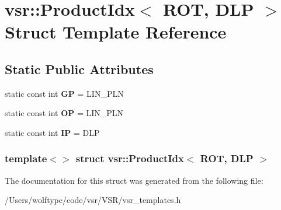 \hypertarget{structvsr_1_1_product_idx_3_01_r_o_t_00_01_d_l_p_01_4}{\section{vsr\-:\-:Product\-Idx$<$ R\-O\-T, D\-L\-P $>$ Struct Template Reference}
\label{structvsr_1_1_product_idx_3_01_r_o_t_00_01_d_l_p_01_4}
}
\subsection*{Static Public Attributes}
\begin{DoxyCompactItemize}
\item 
\hypertarget{structvsr_1_1_product_idx_3_01_r_o_t_00_01_d_l_p_01_4_ae50d3dd9d5b4aa38586cad94fe5c2aaf}{static const int {\bfseries G\-P} = L\-I\-N\-\_\-\-P\-L\-N}\label{structvsr_1_1_product_idx_3_01_r_o_t_00_01_d_l_p_01_4_ae50d3dd9d5b4aa38586cad94fe5c2aaf}

\item 
\hypertarget{structvsr_1_1_product_idx_3_01_r_o_t_00_01_d_l_p_01_4_a73e0216fdcddb2f378d4607c011fc5ba}{static const int {\bfseries O\-P} = L\-I\-N\-\_\-\-P\-L\-N}\label{structvsr_1_1_product_idx_3_01_r_o_t_00_01_d_l_p_01_4_a73e0216fdcddb2f378d4607c011fc5ba}

\item 
\hypertarget{structvsr_1_1_product_idx_3_01_r_o_t_00_01_d_l_p_01_4_a282ee201e4a1ec7c2e3b2a467d6a5302}{static const int {\bfseries I\-P} = D\-L\-P}\label{structvsr_1_1_product_idx_3_01_r_o_t_00_01_d_l_p_01_4_a282ee201e4a1ec7c2e3b2a467d6a5302}

\end{DoxyCompactItemize}
\subsubsection*{template$<$$>$ struct vsr\-::\-Product\-Idx$<$ R\-O\-T, D\-L\-P $>$}



The documentation for this struct was generated from the following file\-:\begin{DoxyCompactItemize}
\item 
/\-Users/wolftype/code/vsr/\-V\-S\-R/vsr\-\_\-templates.\-h\end{DoxyCompactItemize}
